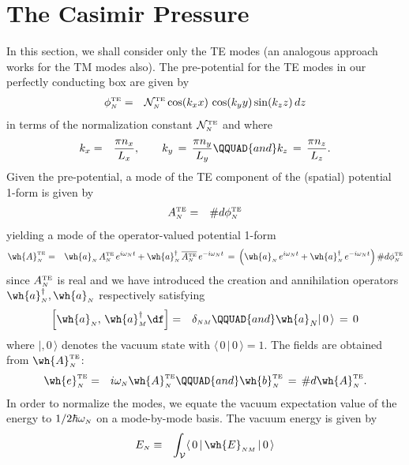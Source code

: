\documentclass[sections]{tjwNOTES}
\newcommand\man[1]{\mathcal{#1}}
\newcommand\kx{k_{x}}
\newcommand\ky{k_{y}}
\newcommand\kz{k_{z}}
\newcommand\nx{n_{x}}
\newcommand\ny{n_{y}}
\newcommand\nz{n_{z}}
\newcommand\Lx{L_{x}}
\newcommand\Ly{L_{y}}
\newcommand\Lz{L_{z}}
\newcommand\N{\mbox{\tiny $N$}}
\renewcommand\M{\mbox{\tiny $M$}}
\newcommand\qquadand{\QQUAD{and}}
\newcommand\TE{\mbox{\tiny TE}}
\newcommand\ahat[1]{\wh{a}_{#1}}
\newcommand\adag[1]{\wh{a}^{\dagger}_{#1}}
\newcommand\V{\man{V}}
\newcommand\VEV[1]{ \langle \, 0 \, | \, #1 \,| \, 0 \, \rangle }
\begin{document}
\section{The Casimir Pressure}
In this section, we shall consider only the TE modes (an analogous approach works for the TM modes also). The pre-potential for the TE modes in our perfectly conducting box are given by
\begin{eqnarray}\label{PP}
    \phi^{\TE}_{\N} &=& \man{N}^{\TE}_{\N} \cos(\kx x)\,\cos(\ky y) \sin(\kz z)\,dz
\end{eqnarray}
in terms of the normalization constant $\man{N}^{\TE}_{\N}$ and where
\begin{eqnarray*}
    \kx &=& \frac{\pi\nx}{\Lx}, \qquad \ky \,=\, \frac{\pi\ny}{\Ly} \qquadand \kz \,=\, \frac{\pi\nz}{\Lz}.
\end{eqnarray*}
Given the pre-potential, a mode of the TE component of the (spatial) potential 1-form is given by
\begin{eqnarray*}
    A^{\TE}_{\N} &=& \# d \phi^{\TE}_{\N}
\end{eqnarray*}
yielding a mode of the operator-valued potential 1-form
\begin{eqnarray*}
    \wh{A}^{\TE}_{\N} &=& \ahat{\N}\,A^{\TE}_{\N}\,e^{i\omega_{\N}t} + \adag{\N}\,\overline{A^{\TE}_{\N}}\,e^{-i\omega_{\N}t} \,=\, \left( \ahat{\N}\,e^{i\omega_{\N}t} + \adag{\N}\,e^{-i\omega_{\N}t} \right)\# d \phi^{\TE}_{\N}
\end{eqnarray*}
since $A^{\TE}_{\N}$ is real and we have introduced the creation and annihilation operators $\adag{\N},\ahat{\N}$ respectively satisfying
\begin{eqnarray}\label{CAop}
    \left[ \ahat{\N}, \, \adag{\M} \df \right] &=& \delta_{\N\M} \qquadand \ahat{N}|\,0\,\rangle \,=\, 0
\end{eqnarray}
where $|,0\,\rangle$ denotes the vacuum state with $\langle \,0\,|\,0\,\rangle=1$. The fields are obtained from $\wh{A}^{\TE}_{\N}$:
\begin{eqnarray*}
    \wh{e}^{\TE}_{\N} &=& i\omega_{\N}\wh{A}^{\TE}_{\N} \qquadand \wh{b}^{\TE}_{\N} \,=\, \# d\wh{A}^{\TE}_{\N}.
\end{eqnarray*}
In order to normalize the modes, we equate the vacuum expectation value of the energy to $1/2\hbar\omega_{\N}$ on a mode-by-mode basis. The vacuum energy is given by
\begin{eqnarray*}
    E_{\N} &\equiv& \int_{\V} \VEV{\wh{E}_{\N\M} }
\end{eqnarray*}
\end{document}
